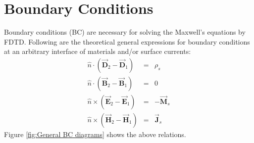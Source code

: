 \section{Boundary Conditions}
    Boundary conditions (BC) are necessary for solving the  Maxwell's equations by FDTD. Following are the theoretical general expressions for boundary conditions at an arbitrary interface of materials and/or surface currents:
	\begin{eqnarray}
	    \hat{n}\cdot(\vec{\mathbf{D}}_2-\vec{\mathbf{D}}_1) &=&\rho_s  \\
	    \hat{n}\cdot(\vec{\mathbf{B}}_2-\vec{\mathbf{B}}_1) &=&0  \\
	    \hat{n}\times(\vec{\mathbf{E}}_2-\vec{\mathbf{E}}_1) &=&-\vec{\mathbf{M}}_s \\
	    \hat{n}\times(\vec{\mathbf{H}}_2-\vec{\mathbf{H}}_1) &=&\vec{\mathbf{J}}_s
	    \label{eq:General boundary conditions}
	\end{eqnarray}
    Figure  \ref{fig:General BC diagrams} shows the above relations.
